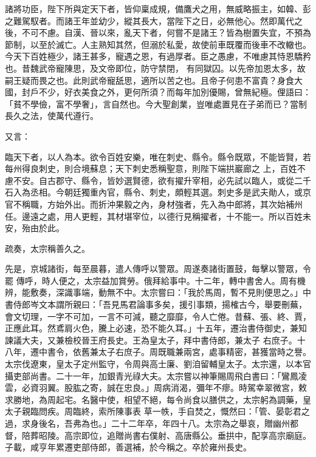 \begin{pinyinscope}
 諸將功臣，陛下所與定天下者，皆仰稟成規，備鷹犬之用，無威略振主，如韓、彭之難駕馭者。而諸王年並幼少，縱其長大，當陛下之日，必無他心。然即萬代之後，不可不慮。自漢、晉以來，亂天下者，何嘗不是諸王？皆為樹置失宜，不預為節制，以至於滅亡。人主熟知其然，但溺於私愛，故使前車既覆而後車不改轍也。今天下百姓極少，諸王甚多，寵遇之恩，有過厚者。臣之愚慮，不唯慮其恃恩驕矜也。昔魏武帝寵陳思，及文帝即位，防守禁閉，
 有同獄囚。以先帝加恩太多，故嗣王疑而畏之也。此則武帝寵舐思，適所以苦之也。且帝子何患不富貴？身食大國，封戶不少，好衣美食之外，更何所須？而每年加別優賜，曾無紀極。俚語曰：「貧不學儉，富不學奢」，言自然也。今大聖創業，豈唯處置見在子弟而已？當制長久之法，使萬代遵行。



 又言：



 臨天下者，以人為本。欲令百姓安樂，唯在刺史、縣令。縣令既眾，不能皆賢，若每州得良刺史，則合境蘇息；天下刺史悉稱聖意，則陛下端拱巖廊之
 上，百姓不慮不安。自古郡守、縣令，皆妙選賢德，欲有擢升宰相，必先試以臨人，或從二千石入為丞相。今朝廷獨重內官，縣令、刺史，頗輕其選。刺史多是武夫勛人，或京官不稱職，方始外出。而折沖果毅之內，身材強者，先入為中郎將，其次始補州任。邊遠之處，用人更輕，其材堪宰位，以德行見稱擢者，十不能一。所以百姓未安，殆由於此。



 疏奏，太宗稱善久之。



 先是，京城諸街，每至晨暮，遣人傳呼以警眾。周遂奏諸街置鼓，每擊以警眾，令罷
 傳呼，時人便之，太宗益加賞勞。俄拜給事中。十二年，轉中書舍人。周有機辨，能敷奏，深識事端，動無不中。太宗嘗曰：「我於馬周，暫不見則便思之。」中書侍郎岑文本謂所親曰：「吾見馬君論事多矣，援引事類，揚榷古今，舉要刪蕪，會文切理，一字不可加，一言不可減，聽之靡靡，令人亡倦。昔蘇、張、終、賈，正應此耳。然鳶肩火色，騰上必速，恐不能久耳。」十五年，遷治書侍御史，兼知諫議大夫，又兼檢校晉王府長史。王為皇太子，拜中書侍郎，兼太子
 右庶子。十八年，遷中書令，依舊兼太子右庶子。周既職兼兩宮，處事精密，甚獲當時之譽。太宗伐遼東，皇太子定州監守，令周與高士廉、劉洎留輔皇太子。太宗還，以本官攝吏部尚書。二十一年，加銀青光祿大夫。太宗嘗以神筆賜周飛白書曰：「鸞鳳凌雲，必資羽翼。股肱之寄，誠在忠良。」周病消渴，彌年不瘳。時駕幸翠微宮，敕求勝地，為周起宅。名醫中使，相望不絕，每令尚食以膳供之，太宗躬為調藥，皇太子親臨問疾。周臨終，索所陳事表
 草一帙，手自焚之，慨然曰：「管、晏彰君之過，求身後名，吾弗為也。」二十二年卒，年四十八。太宗為之舉哀，贈幽州都督，陪葬昭陵。高宗即位，追贈尚書右僕射、高唐縣公。垂拱中，配享高宗廟庭。子載，咸亨年累遷吏部侍郎，善選補，於今稱之。卒於雍州長史。




\end{pinyinscope}
